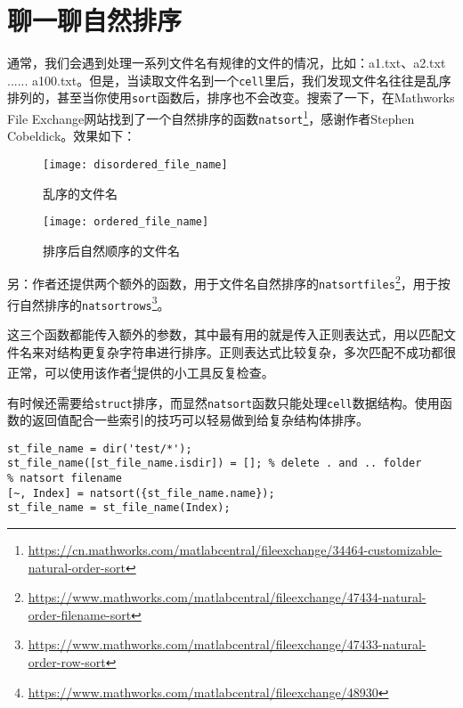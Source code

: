 \section{聊一聊自然排序}

通常，我们会遇到处理一系列文件名有规律的文件的情况，比如：a1.txt、a2.txt ...... a100.txt。但是，当读取文件名到一个\texttt{cell}里后，我们发现文件名往往是乱序排列的，甚至当你使用\texttt{sort}函数后，排序也不会改变。搜索了一下，在Mathworks File Exchange网站找到了一个自然排序的函数\texttt{natsort}\footnote{\url{https://cn.mathworks.com/matlabcentral/fileexchange/34464-customizable-natural-order-sort}}，感谢作者Stephen Cobeldick。效果如下：

\begin{figure}[h]
    \centering
    \begin{minipage}{0.45\textwidth}
        \centering
        \texttt{[image: disordered\_file\_name]}
        \caption{乱序的文件名}
    \end{minipage}
    \begin{minipage}{0.45\textwidth}
        \centering
        \texttt{[image: ordered\_file\_name]}
        \caption{排序后自然顺序的文件名}
    \end{minipage}
\end{figure}

另：作者还提供两个额外的函数，用于文件名自然排序的\texttt{natsortfiles}\footnote{\url{https://www.mathworks.com/matlabcentral/fileexchange/47434-natural-order-filename-sort}}，用于按行自然排序的\texttt{natsortrows}\footnote{\url{https://www.mathworks.com/matlabcentral/fileexchange/47433-natural-order-row-sort}}。

这三个函数都能传入额外的参数，其中最有用的就是传入正则表达式，用以匹配文件名来对结构更复杂字符串进行排序。正则表达式比较复杂，多次匹配不成功都很正常，可以使用该作者\footnote{\url{https://www.mathworks.com/matlabcentral/fileexchange/48930}}提供的小工具反复检查。

有时候还需要给\texttt{struct}排序，而显然\texttt{natsort}函数只能处理\texttt{cell}数据结构。使用函数的返回值配合一些索引的技巧可以轻易做到给复杂结构体排序。

\begin{verbatim}
st_file_name = dir('test/*');
st_file_name([st_file_name.isdir]) = []; % delete . and .. folder
% natsort filename
[~, Index] = natsort({st_file_name.name});
st_file_name = st_file_name(Index);
\end{verbatim}

